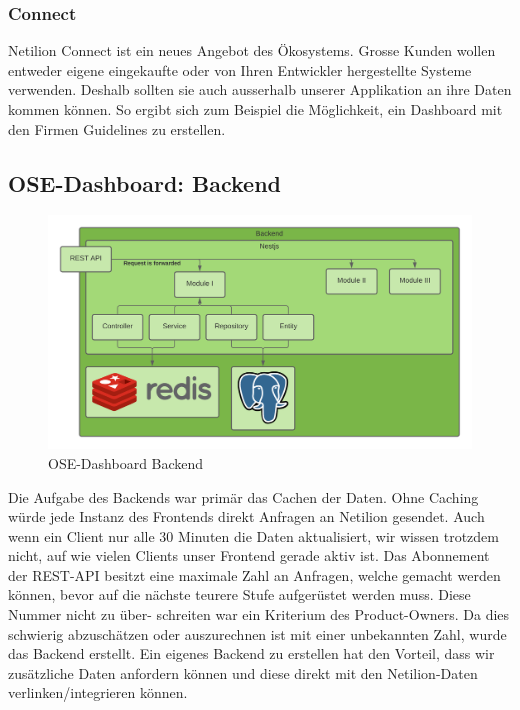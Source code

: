 \subsubsection{Connect}
Netilion Connect ist ein neues Angebot des Ökosystems. Grosse Kunden wollen entweder eigene eingekaufte oder von Ihren Entwickler hergestellte Systeme verwenden. Deshalb sollten sie auch ausserhalb unserer Applikation an ihre Daten kommen können. So ergibt sich zum Beispiel die Möglichkeit, ein Dashboard mit den Firmen Guidelines zu erstellen.
\subsection{OSE-Dashboard: Backend} \label{arch-backend}
\begin{figure}[!ht]
  \centering
  \includegraphics[width=.95\linewidth]{./images/backend.png}
  \caption[{Diagramm OSE-Dashboard Backend von Jonas Schultheiss}]{OSE-Dashboard Backend}
  \label{fig:backend}
\end{figure}
Die Aufgabe des Backends war primär das Cachen der Daten. Ohne Caching würde jede Instanz des Frontends direkt Anfragen an Netilion gesendet. Auch wenn ein Client nur alle 30 Minuten die Daten aktualisiert, wir wissen trotzdem nicht, auf wie vielen Clients unser Frontend gerade aktiv ist. Das Abonnement der REST-API besitzt eine maximale Zahl an Anfragen, welche gemacht werden können, bevor auf die nächste teurere Stufe aufgerüstet werden muss. Diese Nummer nicht zu über- schreiten war ein Kriterium des Product-Owners. Da dies schwierig abzuschätzen oder auszurechnen ist mit einer unbekannten Zahl, wurde das Backend erstellt.
\newline
Ein eigenes Backend zu erstellen hat den Vorteil, dass wir zusätzliche Daten anfordern können und diese direkt mit den Netilion-Daten verlinken/integrieren können.
\newline
